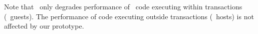 Note that \txjs\ only degrades performance of \js\ code executing within
transactions (\ie~guests). The performance of code executing outside
transactions (\ie~hosts) is not affected by our prototype.



